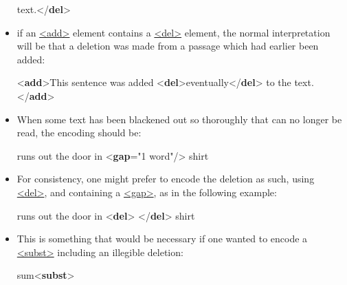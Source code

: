 \begin{itemize}
\begin{shaded}
 text.{</\textbf{del}>}\end{shaded}\egroup\par 
\item if an \hyperref[TEI.add]{<add>} element contains a \hyperref[TEI.del]{<del>} element, the normal interpretation will be that a deletion was made from a passage which had earlier been added: \par\bgroup{}\exampleFont \begin{shaded}\noindent\mbox{}{<\textbf{add}>}This sentence was\mbox{}\newline 
 added {<\textbf{del}>}eventually{</\textbf{del}>} to the text.{</\textbf{add}>}\end{shaded}\egroup\par 
\item When some text has been blackened out so thoroughly that can no longer be read, the encoding should be: \par\bgroup{}\exampleFont \begin{shaded}\noindent\mbox{}runs out the door in {<\textbf{gap}\hspace*{1em}{extent}="{1 word}"/>} shirt\end{shaded}\egroup\par 
\item For consistency, one might prefer to encode the deletion as such, using \hyperref[TEI.del]{<del>}, and containing a \hyperref[TEI.gap]{<gap>}, as in the following example: \par\bgroup{}\exampleFont \begin{shaded}\noindent\mbox{}runs out the door in {<\textbf{del}>}\mbox{}\newline 
{}\mbox{}\newline 
{</\textbf{del}>} shirt\end{shaded}\egroup\par 
\item This is something that would be necessary if one wanted to encode a \hyperref[TEI.subst]{<subst>} including an illegible deletion: \par\bgroup{}\exampleFont \begin{shaded}\noindent\mbox{}sum{<\textbf{subst}>}\mbox{}\newline 

\end{shaded}
\end{itemize}
